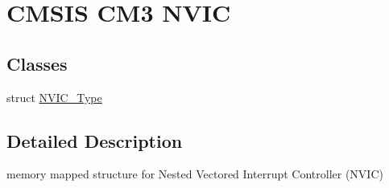 \hypertarget{group___c_m_s_i_s___c_m3___n_v_i_c}{}\section{C\+M\+S\+IS C\+M3 N\+V\+IC}
\label{group___c_m_s_i_s___c_m3___n_v_i_c}
\subsection*{Classes}
\begin{DoxyCompactItemize}
\item 
struct \hyperlink{struct_n_v_i_c___type}{N\+V\+I\+C\+\_\+\+Type}
\end{DoxyCompactItemize}


\subsection{Detailed Description}
memory mapped structure for Nested Vectored Interrupt Controller (N\+V\+IC) 